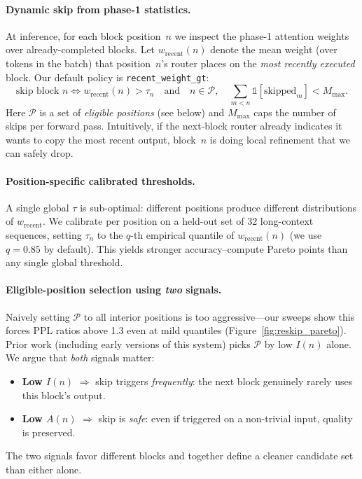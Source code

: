 \documentclass{article}
\begin{document}
\paragraph{Dynamic skip from phase-1 statistics.}
At inference, for each block position~$n$ we inspect the phase-1 attention weights over already-completed blocks. Let $w_{\text{recent}}(n)$ denote the mean weight (over tokens in the batch) that position~$n$'s router places on the \emph{most recently executed} block. Our default policy is \texttt{recent\_weight\_gt}:
\begin{equation}
    \text{skip block } n \iff w_{\text{recent}}(n) > \tau_n \quad\text{and}\quad n \in \mathcal{P},\quad \textstyle\sum_{m<n}\mathbb{1}[\text{skipped}_m] < M_{\max}.
    \label{eq:skip_rule}
\end{equation}
Here $\mathcal{P}$ is a set of \emph{eligible positions} (see below) and $M_{\max}$ caps the number of skips per forward pass. Intuitively, if the next-block router already indicates it wants to copy the most recent output, block~$n$ is doing local refinement that we can safely drop.

\paragraph{Position-specific calibrated thresholds.}
A single global $\tau$ is sub-optimal: different positions produce different distributions of $w_{\text{recent}}$. We calibrate per position on a held-out set of 32 long-context sequences, setting $\tau_n$ to the $q$-th empirical quantile of $w_{\text{recent}}(n)$ (we use $q{=}0.85$ by default). This yields stronger accuracy--compute Pareto points than any single global threshold.

\paragraph{Eligible-position selection using \emph{two} signals.}
Naively setting $\mathcal{P}$ to all interior positions is too aggressive---our sweeps show this forces PPL ratios above 1.3 even at mild quantiles (Figure~\ref{fig:reskip_pareto}). Prior work (including early versions of this system) picks $\mathcal{P}$ by low $I(n)$ alone. We argue that \emph{both} signals matter:
\begin{itemize}
    \item \textbf{Low $I(n)$} $\Rightarrow$ skip triggers \emph{frequently}: the next block genuinely rarely uses this block's output.
    \item \textbf{Low $A(n)$} $\Rightarrow$ skip is \emph{safe}: even if triggered on a non-trivial input, quality is preserved.
\end{itemize}
The two signals favor different blocks and together define a cleaner candidate set than either alone.
\end{document}
